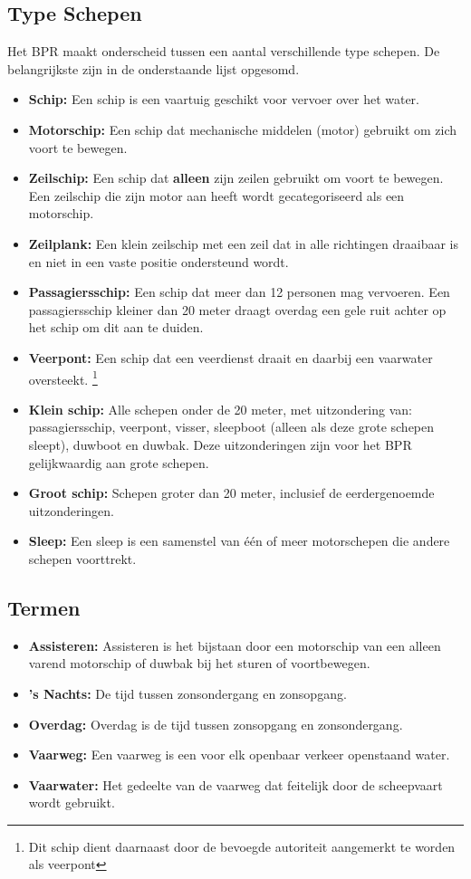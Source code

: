 \subsection{Type Schepen}
Het BPR maakt onderscheid tussen een aantal verschillende type schepen. De belangrijkste zijn in de onderstaande lijst opgesomd.
\begin{itemize}
	\item \textbf{Schip:} Een schip is een vaartuig geschikt voor vervoer over het water.
    \item \textbf{Motorschip:} Een schip dat mechanische middelen (motor) gebruikt om zich voort te bewegen.
    \item \textbf{Zeilschip:} Een schip dat \textbf{alleen} zijn zeilen gebruikt om voort te bewegen. Een zeilschip die zijn motor aan heeft wordt gecategoriseerd als een motorschip.
    \item \textbf{Zeilplank:} Een klein zeilschip met een zeil dat in alle richtingen draaibaar is en niet in een vaste positie ondersteund wordt.
    \item \textbf{Passagiersschip:} Een schip dat meer dan 12 personen mag vervoeren. Een passagiersschip kleiner dan 20 meter draagt overdag een gele ruit achter op het schip om dit aan te duiden. 
    \item \textbf{Veerpont:} Een schip dat een veerdienst draait en daarbij een vaarwater oversteekt. \footnote{Dit schip dient daarnaast door de bevoegde autoriteit aangemerkt te worden als veerpont}
    \item \textbf{Klein schip:} Alle schepen onder de 20 meter, met uitzondering van: passagiersschip, veerpont, visser, sleepboot
(alleen als deze grote schepen sleept), duwboot en duwbak. Deze uitzonderingen zijn voor het BPR gelijkwaardig aan grote schepen. 
    \item \textbf{Groot schip:} Schepen groter dan 20 meter, inclusief de eerdergenoemde uitzonderingen. 
    \item \textbf{Sleep:} Een sleep is een samenstel van één of meer motorschepen die andere schepen voorttrekt. 
\end{itemize}

\newpage
\subsection{Termen}
	\begin{itemize}
		\item \textbf{Assisteren:} Assisteren is het bijstaan door een motorschip van een alleen varend motorschip of duwbak bij het sturen of voortbewegen.
		\item \textbf{'s Nachts:} De tijd tussen zonsondergang en zonsopgang.
		\item \textbf{Overdag:} Overdag is de tijd tussen zonsopgang en zonsondergang.
		\item \textbf{Vaarweg:} Een vaarweg is een voor elk openbaar verkeer openstaand water.
		\item \textbf{Vaarwater:} Het gedeelte van de vaarweg dat feitelijk door de scheepvaart wordt gebruikt.
	\end{itemize}

